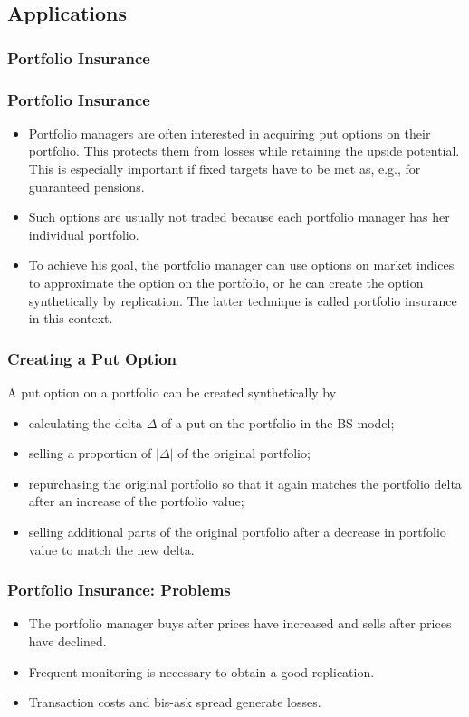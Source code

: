 \subsection{Applications}
\subsubsection{Portfolio Insurance}

\begin{frame}[fragile]
\frametitle{Portfolio Insurance}
\begin{itemize}
  \item Portfolio managers are often interested in acquiring put options on
  their portfolio. This protects them from losses while retaining the upside
  potential. This is especially important if fixed targets have to be met as,
  e.g., for guaranteed pensions.
  \item Such options are usually not traded because each portfolio manager has
  her individual portfolio. 
  \item To achieve his goal, the portfolio manager can use options on market
  indices to approximate the option on the portfolio, or he can create the
  option synthetically by replication. The latter technique is called portfolio
  insurance in this context.
\end{itemize}
\end{frame}

\begin{frame}[fragile]
\frametitle{Creating a Put Option}
A put option on a portfolio can be created synthetically by
\begin{itemize}
  \item calculating the delta $\Delta$ of a put on the portfolio in the BS model;
  \item selling a proportion of $\vert \Delta \vert$ of the original portfolio;
  \item repurchasing the original portfolio so that it again matches the
  portfolio delta after an increase of the portfolio value;
  \item selling additional parts of the original portfolio after a decrease in
  portfolio value to match the new delta.
\end{itemize}
\end{frame}

\begin{frame}[fragile]
\frametitle{Portfolio Insurance: Problems}
\begin{itemize}
  \item The portfolio manager buys after prices have increased and sells after
  prices have declined.
  \item Frequent monitoring is necessary to obtain a good replication.
  \item Transaction costs and bis-ask spread generate losses.
\end{itemize}
\end{frame}

